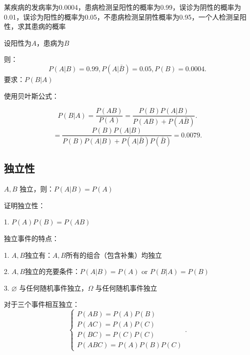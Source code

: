 \begin{eg}
    某疾病的发病率为0.0004，患病检测呈阳性的概率为0.99，误诊为阴性的概率为0.01，误诊为阳性的概率为0.05，不患病检测呈阴性概率为0.95，一个人检测呈阳性，求其患病的概率

    设阳性为$A$，患病为$B$

    则： \[
        P\left( A|B \right) =0.99,P\left( A|\bar{B} \right) =0.05,P\left( B \right) =0.0004
    .\] 
    要求：$P\left( B|A \right) $ 

    使用贝叶斯公式：

    \[
        P\left( B|A \right) =\frac{P\left( AB \right) }{P\left( A \right) }=\frac{P\left( B \right) P\left( A|B \right) }{P\left( AB \right) +P\left( A\bar{B} \right) }
    .\] 
    \[
        =\frac{P\left( B \right) P\left( A|B \right) }{P\left( B \right) P\left( A|B \right) +P\left( A|\bar{B} \right) P\left( \bar{B} \right) }=0.0079
    .\] 
\end{eg}
\subsection{独立性}%
\label{sub:独立性}
\begin{defi}
    $A,B$ 独立，则：$P\left( A|B \right) =P\left( A \right) $
\end{defi}
\begin{notation}
    证明独立性：

    1. $P\left( A \right) P\left( B \right) =P\left( AB \right) $ 
\end{notation}
\begin{notation}
    独立事件的特点：
    
    1. $A,B$独立有：$A,B$所有的组合（包含补集）均独立

    2. $A,B$独立的充要条件：$P\left( A|B \right) =P\left( A \right) \text{ or } P\left( B|A \right) =P\left( B \right) $

    3. $\varnothing$ 与任何随机事件独立，$\Omega$ 与任何随机事件独立
\end{notation}
对于三个事件相互独立：
\[
    \begin{cases}
        P\left( AB \right) =P\left( A \right) P\left( B \right) \\
        P\left( AC \right) =P\left( A \right) P\left( C \right) \\
        P\left( BC \right) =P\left( C \right) P\left( C \right) \\
        P\left( ABC \right) =P\left( A \right) P\left( B \right) P\left( C \right) 
    \end{cases}
.\] 

